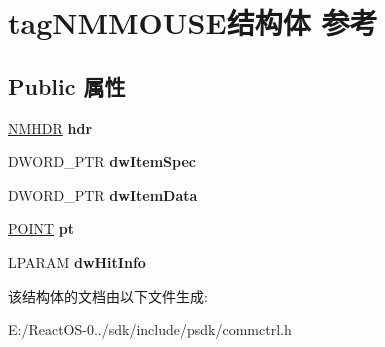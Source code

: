 \hypertarget{structtag_n_m_m_o_u_s_e}{}\section{tag\+N\+M\+M\+O\+U\+S\+E结构体 参考}
\label{structtag_n_m_m_o_u_s_e}
\subsection*{Public 属性}
\begin{DoxyCompactItemize}
\item 
\mbox{\label{structtag_n_m_m_o_u_s_e_a92a36da52c7e59f1657915410b96b422}} 
\hyperlink{structtag_n_m_h_d_r}{N\+M\+H\+DR} {\bfseries hdr}
\item 
\mbox{\label{structtag_n_m_m_o_u_s_e_a7fab1cf675eb5358983bfd6c0cfe708e}} 
D\+W\+O\+R\+D\+\_\+\+P\+TR {\bfseries dw\+Item\+Spec}
\item 
\mbox{\label{structtag_n_m_m_o_u_s_e_a5a0cdc279abf5ab6b93a598fbe55c517}} 
D\+W\+O\+R\+D\+\_\+\+P\+TR {\bfseries dw\+Item\+Data}
\item 
\mbox{\label{structtag_n_m_m_o_u_s_e_a1380a9ee4640f475b5f07992d2064d5a}} 
\hyperlink{structtag_p_o_i_n_t}{P\+O\+I\+NT} {\bfseries pt}
\item 
\mbox{\label{structtag_n_m_m_o_u_s_e_aa691f15c44d3ba4dd9c369670b9a1c2b}} 
L\+P\+A\+R\+AM {\bfseries dw\+Hit\+Info}
\end{DoxyCompactItemize}


该结构体的文档由以下文件生成\+:\begin{DoxyCompactItemize}
\item 
E\+:/\+React\+O\+S-\/0../sdk/include/psdk/commctrl.\+h\end{DoxyCompactItemize}

